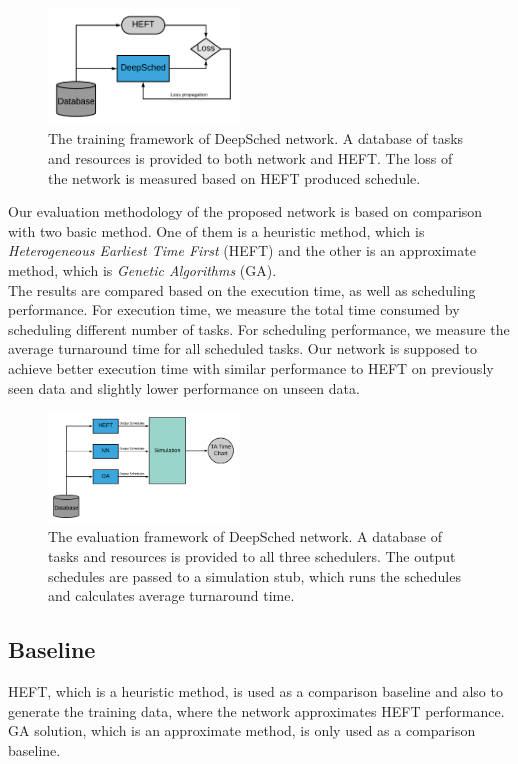 \begin{figure}[hp]
    \centering
    \includegraphics[width=0.45\textwidth]{diagrams/train_framework}
    \caption{The training framework of DeepSched network. A database of tasks and resources is provided to both network and HEFT. The loss of the network is measured based on HEFT produced schedule.}
    \label{fig:fw}
\end{figure}

Our evaluation methodology of the proposed network is based on comparison with two basic method. One of them is a heuristic method, which is \emph{Heterogeneous Earliest Time First} (HEFT) and the other is an approximate method, which is \emph{Genetic Algorithms} (GA). \\

The results are compared based on the execution time, as well as scheduling performance. For execution time, we measure the total time consumed by scheduling different number of tasks. For scheduling performance, we measure the average turnaround time for all scheduled tasks. Our network is supposed to achieve better execution time with similar performance to HEFT on previously seen data and slightly lower performance on unseen data. 

\begin{figure}[hp]
    \centering
    \includegraphics[width=0.45\textwidth]{diagrams/eval_framework}
    \caption{The evaluation framework of DeepSched network. A database of tasks and resources is provided to all three schedulers. The output schedules are passed to a simulation stub, which runs the schedules and calculates average turnaround time.}
    \label{fig:efw}
\end{figure}

\subsection{Baseline}
HEFT, which is a heuristic method, is used as a comparison baseline and also to generate the training data, where the network approximates HEFT performance. GA solution, which is an approximate method, is only used as a comparison baseline. \\

